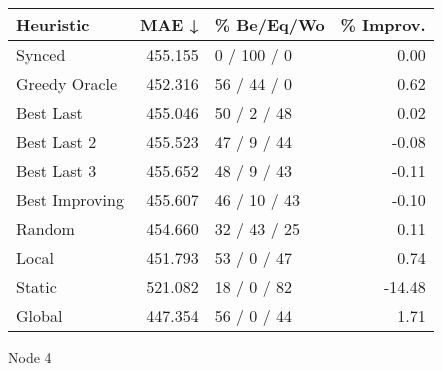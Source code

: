 \begin{tabular}{lrlr}
\toprule
\textbf{Heuristic} & \textbf{MAE ↓} & \textbf{\% Be/Eq/Wo} & \textbf{\% Improv.} \\
\midrule
            Synced &        455.155 &          0 / 100 / 0 &                0.00 \\
     Greedy Oracle &        452.316 &          56 / 44 / 0 &                0.62 \\
         Best Last &        455.046 &          50 / 2 / 48 &                0.02 \\
       Best Last 2 &        455.523 &          47 / 9 / 44 &               -0.08 \\
       Best Last 3 &        455.652 &          48 / 9 / 43 &               -0.11 \\
    Best Improving &        455.607 &         46 / 10 / 43 &               -0.10 \\
            Random &        454.660 &         32 / 43 / 25 &                0.11 \\
             Local &        451.793 &          53 / 0 / 47 &                0.74 \\
            Static &        521.082 &          18 / 0 / 82 &              -14.48 \\
            Global &        447.354 &          56 / 0 / 44 &                1.71 \\
\bottomrule
\end{tabular}
\caption{Node 4}
\label{tab:iid_lr05_le1_bs4_4}
